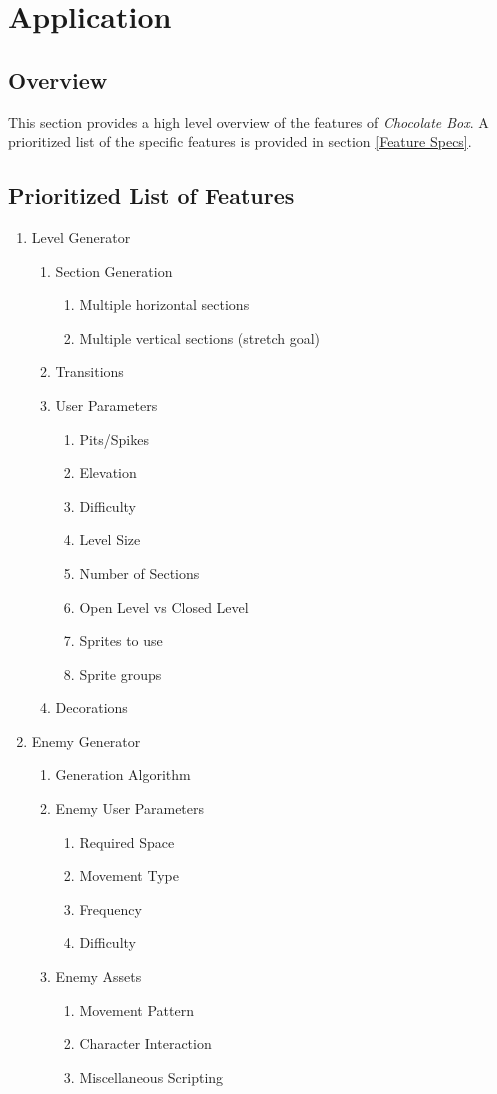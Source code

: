 \documentclass[pdftex,12pt,letter]{article}
\begin{document}
\section{Application}
\subsection{Overview}
This section provides a high level overview of the features of \textit{Chocolate Box}. A prioritized list of the specific features is provided in section \ref{Feature Specs}.

\subsection{Prioritized List of Features}
\begin{enumerate}
\item Level Generator
\begin{enumerate}
\item Section Generation
\begin{enumerate}
\item Multiple horizontal sections
\item Multiple vertical sections (stretch goal)
\end{enumerate}
\item Transitions
\item User Parameters
\begin{enumerate}
\item Pits/Spikes
\item Elevation
\item Difficulty
\item Level Size
\item Number of Sections
\item Open Level vs Closed Level
\item Sprites to use
\item Sprite groups
\end{enumerate}
\item Decorations
\end{enumerate}

\item Enemy Generator
\begin{enumerate}
\item Generation Algorithm
\item Enemy User Parameters
\begin{enumerate}
\item Required Space
\item Movement Type
\item Frequency
\item Difficulty
\end{enumerate}
\item Enemy Assets
\begin{enumerate}
\item Movement Pattern
\item Character Interaction
\item Miscellaneous Scripting
\end{enumerate}
\end{enumerate}


\end{enumerate}
\end{document}
